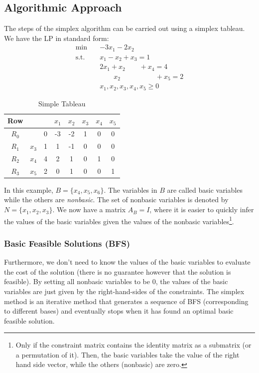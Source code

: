 \documentclass{article}
\begin{document}
\subsection{Algorithmic Approach}\label{sec:2-algorithmicapproach}
The steps of the simplex algorithm can be carried out using a simplex tableau. We have the LP in standard form: \begin{align*}
    \min \quad & -3 x_{1} -2 x_{2} \\ 
    \text{s.t.} \quad & x_{1} -x_{2} + x_{3} = 1 \\ 
    & 2 x_{1} + x_{2} \qquad + x_{4} = 4 \\ 
    & \qquad x_{2} \qquad \quad \qquad + x_{5} = 2 \\ 
    & x_{1}, x_{2}, x_{3}, x_{4}, x_{5} \geq 0 
\end{align*}

\begin{table}[H]
    \centering
    \begin{tabular}{c | c c | c c c c c}
        Row & & & $x_{1}$ & $x_{2}$ & $x_{3}$ & $x_{4}$ & $x_{5}$ \\ \hline 
        $R_{0}$ & & 0 & -3 & -2 & 1 & 0 & 0 \\ \hline 
        $R_{1}$ & $x_{3}$ & 1 & 1 & -1 & 0 & 0 & 0 \\ 
        $R_{2}$ & $x_{4}$ & 4 & 2 & 1 & 0 & 1 & 0 \\ 
        $R_{3}$ & $x_{5}$ & 2 & 0 & 1 & 0 & 0 & 1
    \end{tabular}
    \caption{Simple Tableau}
    \label{tab: 2-tableau}
\end{table} 

\noindent In this example, $B = \{x_{4}, x_{5}, x_{6}\}$. The variables in $B$ are called basic variables while the others are \textit{nonbasic}. The set of nonbasic variables is denoted by $N = \{x_{1}, x_{2}, x_{3}\}$. We now have a matrix $A_B = I$, where it is easier to quickly infer the values of the basic variables given the values of the nonbasic variables\footnote{Only if the constraint matrix contains the identity matrix as a submatrix (or a permutation of it). Then, the basic variables take the value of the right hand side vector, while the others (nonbasic) are zero.}. \\ 


\subsubsection{Basic Feasible Solutions (BFS)} 
Furthermore, we don't need to know the values of the basic variables to evaluate the cost of the solution (there is no guarantee however that the solution is feasible). By setting all nonbasic variables to be 0, the values of the basic variables are just given by the right-hand-sides of the constraints. The simplex method is an iterative method that generates a sequence of BFS (corresponding to different bases) and eventually stops when it has found an optimal basic feasible solution. \\ 
\end{document}
